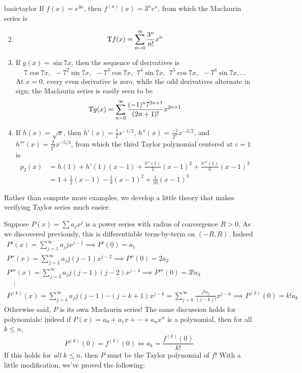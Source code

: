 \begin{examples}{}{basictaylor}
\exstart If $f(x)=e^{3x}$, then $f^{(n)}(x)=3^ne^x$, from which the Maclaurin series is\vspace{-18pt}
\begin{enumerate}\setcounter{enumi}{1}
  \item[]\[\mathrm{T} f(x)=\sum_{n=0}^\infty\frac{3^n}{n!}x^n\]
  \item If $g(x)=\sin 7x$, then the sequence of derivatives is
  \[7\cos 7x,\ \ -7^2\sin 7x,\ \ -7^3\cos 7x,\ \ 7^4\sin 7x,\ \ 7^5\cos 7x,\ \ -7^6\sin 7x,\ldots\]
	At $x=0$, every even derivative is zero, while the odd derivatives alternate in sign; the Maclaurin series is easily seen to be
  \[\mathrm{T} g(x)=\sum_{n=0}^\infty\frac{(-1)^n7^{2n+1}}{(2n+1)!}x^{2n+1}\]
  \item\label{ex:basictaylor3} If $h(x)=\sqrt x$, then $h'(x)=\frac 12x^{-1/2}$, $h''(x)=\frac{-1}{2^2}x^{-3/2}$, and $h'''(x)=\frac{3}{2^3}x^{-5/2}$, from which the third Taylor polynomial centered at $c=1$ is
  \begin{align*}
  p_2(x)&=h(1)+h'(1)(x-1)+\frac{h''(1)}{2}(x-1)^2+\frac{h'''(1)}{6}(x-1)^3\\
  &=1+\frac 12(x-1)-\frac 18(x-1)^2+\frac 1{16}(x-1)^3
  \end{align*}
\end{enumerate}
\end{examples}

Rather than compute more examples, we develop a little theory that makes verifying Taylor series much easier.
\goodbreak


	
	
Suppose $P(x)=\sum a_jx^j$ is a power series with radius of convergence $R>0$. As we discovered previously, this is differentiable term-by-term on $(-R,R)$. Indeed
\begin{gather*}
P'(x)=\sum_{j=1}^\infty a_jjx^{j-1} \implies P'(0)=a_1\\
P''(x)=\sum_{j=2}^\infty a_jj(j-1)x^{j-2} \implies P''(0)=2a_2\\
P'''(x)=\sum_{j=3}^\infty a_jj(j-1)(j-2)x^{j-3} \implies P'''(0)=3!a_3\\[-8pt]
\quad\vdots\\[-3pt]
P^{(k)}(x)=\sum_{j=k}^\infty a_jj(j-1)\cdots(j-k+1)x^{j-k}=\sum_{j=k}^\infty\frac{j!a_j}{(j-k)!}x^{j-k} \implies P^{(k)}(0)=k!a_k
\end{gather*}
Otherwise said, $P$ is its own Maclaurin series! The same discussion holds for polynomials: indeed if $P(x)=a_0+a_1x+\cdots+a_nx^n$ is a polynomial, then for all $k\le n$,
\[P^{(k)}(0)=f^{(k)}(0)\iff a_k=\frac{f^{(k)}(0)}{k!}\]
If this holds for \emph{all} $k\le n$, then $P$ must be the Taylor polynomial of $f$! With a little modification, we've proved the following:

